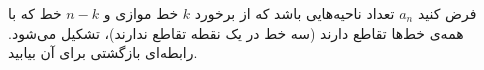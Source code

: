     \p 
فرض کنید
$a_n$
تعداد ناحیه‌هایی باشد که از برخورد
$k$
خط موازی و
$n - k$
خط که با همه‌ی خط‌ها تقاطع دارند (سه خط در یک نقطه تقاطع ندارند)، تشکیل می‌شود. رابطه‌ای بازگشتی برای آن بیابید.